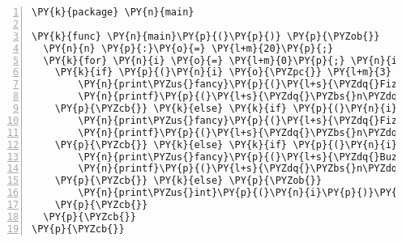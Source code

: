 \begin{Verbatim}[commandchars=\\\{\},numbers=left,firstnumber=1,stepnumber=1]
\PY{k}{package} \PY{n}{main}

\PY{k}{func} \PY{n}{main}\PY{p}{(}\PY{p}{)} \PY{p}{\PYZob{}}
  \PY{n}{n} \PY{p}{:}\PY{o}{=} \PY{l+m}{20}\PY{p}{;}
  \PY{k}{for} \PY{n}{i} \PY{o}{=} \PY{l+m}{0}\PY{p}{;} \PY{n}{i} \PY{o}{\PYZlt{}} \PY{n}{n}\PY{p}{;} \PY{n}{i} \PY{o}{+=} \PY{l+m}{1} \PY{p}{\PYZob{}}
    \PY{k}{if} \PY{p}{(}\PY{n}{i} \PY{o}{\PYZpc{}} \PY{l+m}{3} \PY{o}{==} \PY{l+m}{0} \PY{o}{\PYZam{}\PYZam{}} \PY{n}{i} \PY{o}{\PYZpc{}} \PY{l+m}{5} \PY{o}{==} \PY{l+m}{0}\PY{p}{)} \PY{p}{\PYZob{}}
        \PY{n}{print\PYZus{}fancy}\PY{p}{(}\PY{l+s}{\PYZdq{}Fizzbuzz\PYZdq{}}\PY{p}{,} \PY{l+m}{4}\PY{p}{,} \PY{l+m}{9}\PY{p}{,} \PY{k+kc}{true}\PY{p}{,} \PY{k+kc}{true}\PY{p}{)}\PY{p}{;}
        \PY{n}{printf}\PY{p}{(}\PY{l+s}{\PYZdq{}\PYZbs{}n\PYZdq{}}\PY{p}{)}\PY{p}{;}
    \PY{p}{\PYZcb{}} \PY{k}{else} \PY{k}{if} \PY{p}{(}\PY{n}{i} \PY{o}{\PYZpc{}} \PY{l+m}{5} \PY{o}{==} \PY{l+m}{0}\PY{p}{)} \PY{p}{\PYZob{}}
        \PY{n}{print\PYZus{}fancy}\PY{p}{(}\PY{l+s}{\PYZdq{}Fizz\PYZdq{}}\PY{p}{,} \PY{l+m}{40}\PY{p}{,} \PY{l+m}{0}\PY{p}{,} \PY{k+kc}{true}\PY{p}{,} \PY{k+kc}{false}\PY{p}{)}\PY{p}{;}
        \PY{n}{printf}\PY{p}{(}\PY{l+s}{\PYZdq{}\PYZbs{}n\PYZdq{}}\PY{p}{)}\PY{p}{;}
    \PY{p}{\PYZcb{}} \PY{k}{else} \PY{k}{if} \PY{p}{(}\PY{n}{i} \PY{o}{\PYZpc{}} \PY{l+m}{3} \PY{o}{==} \PY{l+m}{0}\PY{p}{)} \PY{p}{\PYZob{}}
        \PY{n}{print\PYZus{}fancy}\PY{p}{(}\PY{l+s}{\PYZdq{}Buzz\PYZdq{}}\PY{p}{,} \PY{l+m}{200}\PY{p}{,} \PY{l+m}{0}\PY{p}{,} \PY{k+kc}{false}\PY{p}{,} \PY{k+kc}{true}\PY{p}{)}\PY{p}{;}
        \PY{n}{printf}\PY{p}{(}\PY{l+s}{\PYZdq{}\PYZbs{}n\PYZdq{}}\PY{p}{)}\PY{p}{;}
    \PY{p}{\PYZcb{}} \PY{k}{else} \PY{p}{\PYZob{}}
        \PY{n}{print\PYZus{}int}\PY{p}{(}\PY{n}{i}\PY{p}{)}\PY{p}{;}
    \PY{p}{\PYZcb{}}
  \PY{p}{\PYZcb{}}
\PY{p}{\PYZcb{}}
\end{Verbatim}
